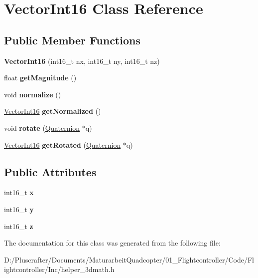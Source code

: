 \hypertarget{class_vector_int16}{}\section{Vector\+Int16 Class Reference}
\label{class_vector_int16}
\subsection*{Public Member Functions}
\begin{DoxyCompactItemize}
\item 
\mbox{\label{class_vector_int16_acce45f37b3f90df1d5aff6edbf12f02b}} 
{\bfseries Vector\+Int16} (int16\+\_\+t nx, int16\+\_\+t ny, int16\+\_\+t nz)
\item 
\mbox{\label{class_vector_int16_aeb8087ac5732450bc18ac944a16d0694}} 
float {\bfseries get\+Magnitude} ()
\item 
\mbox{\label{class_vector_int16_aefdadb30fbc20b564bbbf0b1a885e349}} 
void {\bfseries normalize} ()
\item 
\mbox{\label{class_vector_int16_a1f2c17ac660f1e90a095f9e7914200c5}} 
\mbox{\hyperlink{class_vector_int16}{Vector\+Int16}} {\bfseries get\+Normalized} ()
\item 
\mbox{\label{class_vector_int16_ac7bf149db0a2b66d7683b87ebeb2dfc5}} 
void {\bfseries rotate} (\mbox{\hyperlink{class_quaternion}{Quaternion}} $\ast$q)
\item 
\mbox{\label{class_vector_int16_a9e1d9f4553b069bf353e807f130a285b}} 
\mbox{\hyperlink{class_vector_int16}{Vector\+Int16}} {\bfseries get\+Rotated} (\mbox{\hyperlink{class_quaternion}{Quaternion}} $\ast$q)
\end{DoxyCompactItemize}
\subsection*{Public Attributes}
\begin{DoxyCompactItemize}
\item 
\mbox{\label{class_vector_int16_a648435b4c99e9da9c95549ac344beaec}} 
int16\+\_\+t {\bfseries x}
\item 
\mbox{\label{class_vector_int16_a5d340e1f1bcbc064e5084ca609a6a6a3}} 
int16\+\_\+t {\bfseries y}
\item 
\mbox{\label{class_vector_int16_af1b5c4c297bdd32751ab4519480b919f}} 
int16\+\_\+t {\bfseries z}
\end{DoxyCompactItemize}


The documentation for this class was generated from the following file\+:\begin{DoxyCompactItemize}
\item 
D\+:/\+Pluscrafter/\+Documents/\+Maturarbeit\+Quadcopter/01\+\_\+\+Flightcontroller/\+Code/\+Flightcontroller/\+Inc/helper\+\_\+3dmath.\+h\end{DoxyCompactItemize}
